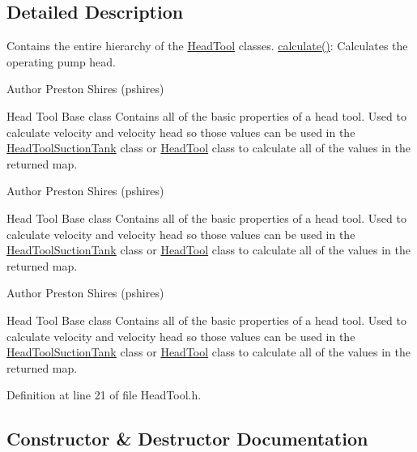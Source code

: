 \subsection{Detailed Description}
Contains the entire hierarchy of the \hyperlink{class_head_tool}{Head\+Tool} classes. \hyperlink{class_head_tool_base_ab8df8f908827ce45dc5e769ea0e10f0b}{calculate()}\+: Calculates the operating pump head. 

\begin{DoxyAuthor}{Author}
Preston Shires (pshires) 
\end{DoxyAuthor}
Head Tool Base class Contains all of the basic properties of a head tool. Used to calculate velocity and velocity head so those values can be used in the \hyperlink{class_head_tool_suction_tank}{Head\+Tool\+Suction\+Tank} class or \hyperlink{class_head_tool}{Head\+Tool} class to calculate all of the values in the returned map.

\begin{DoxyAuthor}{Author}
Preston Shires (pshires) 
\end{DoxyAuthor}
Head Tool Base class Contains all of the basic properties of a head tool. Used to calculate velocity and velocity head so those values can be used in the \hyperlink{class_head_tool_suction_tank}{Head\+Tool\+Suction\+Tank} class or \hyperlink{class_head_tool}{Head\+Tool} class to calculate all of the values in the returned map.

\begin{DoxyAuthor}{Author}
Preston Shires (pshires) 
\end{DoxyAuthor}
Head Tool Base class Contains all of the basic properties of a head tool. Used to calculate velocity and velocity head so those values can be used in the \hyperlink{class_head_tool_suction_tank}{Head\+Tool\+Suction\+Tank} class or \hyperlink{class_head_tool}{Head\+Tool} class to calculate all of the values in the returned map. 

Definition at line 21 of file Head\+Tool.\+h.



\subsection{Constructor \& Destructor Documentation}
\mbox{\label{class_head_tool_base_ae5bb2325e1266c64b16937d964aea14f}} 

